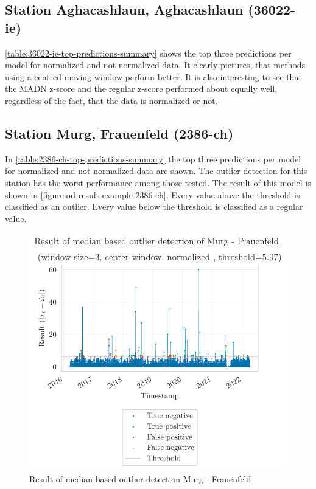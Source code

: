 \subsection{Station Aghacashlaun, Aghacashlaun (36022-ie)}
\autoref{table:36022-ie-top-predictions-summary} shows the top three predictions per model for normalized and not normalized data. It clearly pictures, that methods using a centred moving window perform better. It is also interesting to see that the \ac{MADN} z-score and the regular z-score performed about equally well, regardless of the fact, that the data is normalized or not.


\subsection{Station Murg, Frauenfeld (2386-ch)}
In \autoref{table:2386-ch-top-predictions-summary} the top three predictions per model for normalized and not normalized data are shown. The outlier detection for this station has the worst performance among those tested. The result of this model is shown in \autoref{figure:od-result-example-2386-ch}. Every value above the threshold is classified as an outlier. Every value below the threshold is classified as a regular value.

\begin{figure}[htp]
    \centering 
    \includegraphics{plots/pdfs/2386-ch/od_result_median_2386-ch_all.pdf}
    \caption{Result of median-based outlier detection Murg - Frauenfeld}
    \label{figure:od-result-example-2386-ch}
\end{figure}


